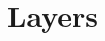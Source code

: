 \documentclass[../../../../main.tex]{subfiles}
\begin{document}
\section{Layers}

\newpage
\end{document}
